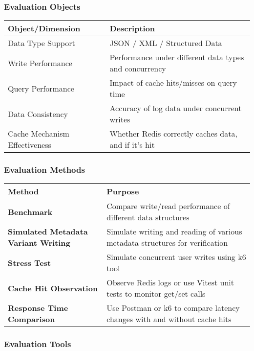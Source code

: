 \documentclass{article}
\begin{document}
\subsubsection{Evaluation Objects}

\begin{tabular}{|l|l|}
\hline
\textbf{Object/Dimension} & \textbf{Description} \\
\hline
Data Type Support & JSON / XML / Structured Data \\
Write Performance & Performance under different data types and concurrency \\
Query Performance & Impact of cache hits/misses on query time \\
Data Consistency & Accuracy of log data under concurrent writes \\
Cache Mechanism Effectiveness & Whether Redis correctly caches data, and if it's hit \\
\hline
\end{tabular}

\subsubsection{Evaluation Methods}

\begin{tabular}{|l|l|}
\hline
\textbf{Method} & \textbf{Purpose} \\
\hline
\textbf{Benchmark} & Compare write/read performance of different data structures \\
\textbf{Simulated Metadata Variant Writing} & Simulate writing and reading of various metadata structures for verification \\
\textbf{Stress Test} & Simulate concurrent user writes using k6 tool \\
\textbf{Cache Hit Observation} & Observe Redis logs or use Vitest unit tests to monitor get/set calls \\
\textbf{Response Time Comparison} & Use Postman or k6 to compare latency changes with and without cache hits \\
\hline
\end{tabular}

\subsubsection{Evaluation Tools}
\end{document}
